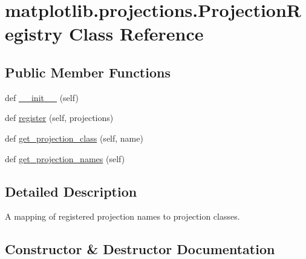 \hypertarget{classmatplotlib_1_1projections_1_1ProjectionRegistry}{}\section{matplotlib.\+projections.\+Projection\+Registry Class Reference}
\label{classmatplotlib_1_1projections_1_1ProjectionRegistry}
\subsection*{Public Member Functions}
\begin{DoxyCompactItemize}
\item 
def \hyperlink{classmatplotlib_1_1projections_1_1ProjectionRegistry_a251ccabbb7557efdace7d7f57c658181}{\+\_\+\+\_\+init\+\_\+\+\_\+} (self)
\item 
def \hyperlink{classmatplotlib_1_1projections_1_1ProjectionRegistry_a62a2e01e1d7ce444191f0f7fdfc28a0a}{register} (self, projections)
\item 
def \hyperlink{classmatplotlib_1_1projections_1_1ProjectionRegistry_a115b82d11ea9c8e8116ae8b3b8c96974}{get\+\_\+projection\+\_\+class} (self, name)
\item 
def \hyperlink{classmatplotlib_1_1projections_1_1ProjectionRegistry_aafbafd7f659eee2096fed463e88593cd}{get\+\_\+projection\+\_\+names} (self)
\end{DoxyCompactItemize}


\subsection{Detailed Description}
\begin{DoxyVerb}A mapping of registered projection names to projection classes.\end{DoxyVerb}
 

\subsection{Constructor \& Destructor Documentation}
\mbox{\label{classmatplotlib_1_1projections_1_1ProjectionRegistry_a251ccabbb7557efdace7d7f57c658181}} 
